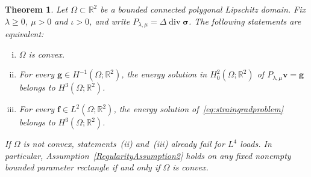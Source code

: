 \documentclass[10pt]{amsart}
\newtheorem{theorem}{Theorem}[section]
\renewcommand{\div}{\operatorname{div}}
\numberwithin{equation}{section}
\begin{document}
\begin{theorem}\label{thm:polygon-regularity}
Let $\Omega\subset\mathbb R^2$ be a bounded connected polygonal Lipschitz domain. Fix $\lambda\geq0$, $\mu>0$ and $\iota>0$, and write $P_{\lambda,\mu}=\Delta\div\boldsymbol\sigma$. The following statements are equivalent:
\begin{enumerate}[(i)]
\item $\Omega$ is convex.
\item For every $\boldsymbol g\in H^{-1}(\Omega;\mathbb R^2)$, the energy solution in $H_0^2(\Omega;\mathbb R^2)$ of $P_{\lambda,\mu}\boldsymbol v=\boldsymbol g$ belongs to $H^3(\Omega;\mathbb R^2)$.
\item For every $\boldsymbol f\in L^2(\Omega;\mathbb R^2)$, the energy solution of~\eqref{eq:straingradproblem} belongs to $H^3(\Omega;\mathbb R^2)$.
\end{enumerate}
If $\Omega$ is not convex, statements~{\rm(ii)} and~{\rm(iii)} already fail for $L^4$ loads. In particular, Assumption~\ref{RegularityAssumption2} holds on any fixed nonempty bounded parameter rectangle if and only if $\Omega$ is convex.
\end{theorem}
\end{document}
